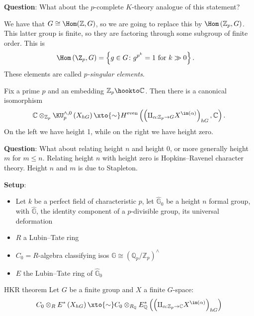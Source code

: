 \textbf{Question}: What about the $p$-complete $K$-theory analogue of this statement?

We have that $G \cong \Hom(\mathbb{Z},G)$, so we are going to replace this by $\Hom \left( \mathbb{Z}_p, G \right)$. This latter group is finite, so they are factoring through some subgroup of finite order. This is
\begin{align*}
    \Hom \left( \Z_p, G \right) &= \left\{ g\in G \colon g^{p^k} = 1 \text{ for } k \gg 0 \right\}.
\end{align*}
These elements are called $p$\textit{-singular elements}.

\begin{theorem} Fix a prime $p$ and an embedding $\mathbb{Z}_p \hookto \mathbb{C}$. Then there is a canonical isomorphism
\begin{align*}
    \mathbb{C} \otimes_{\mathbb{Z}_p} \KU_p^{\wedge,0} \left( X_{hG} \right) \xto{\sim} H^\text{even} \left( \left( \amalg_{\alpha:\mathbb{Z}_p \to G} X^{\im(\alpha)} \right)_{hG}, \mathbb{C} \right).
\end{align*}
On the left we have height 1, while on the right we have height zero.
\end{theorem}

\textbf{Question}: What about relating height $n$ and height $0$, or more generally height $m$ for $m\le n$. Relating height $n$ with height zero is Hopkins--Ravenel character theory. Height $n$ and $m$ is due to Stapleton.

\textbf{Setup}:
\begin{itemize}
    \item Let $k$ be a perfect field of characteristic $p$, let $\hat{\mathbb{G}}_0$ be a height $n$ formal group, with $\hat{\mathbb{G}}$, the identity component of a $p$-divisible group, its universal deformation
    \item $R$ a Lubin--Tate ring
    \item $C_0= R$-algebra classifying isos $\mathbb{G} \cong \left( \mathbb{Q}_p/\mathbb{Z}_p \right)^\wedge$
    \item $E$ the Lubin--Tate ring of $\hat{\mathbb{G}}_0$
\end{itemize}

\begin{customenvironment}{HKR theorem} Let $G$ be a finite group and $X$ a finite $G$-space:
\begin{align*}
     C_0 \otimes_R E^\ast \left( X_{hG} \right) \xto{\sim}  C_0 \otimes_{R_\mathbb{Q}} E_\mathbb{Q}^\ast \left( \left( \amalg_{\alpha: \mathbb{Z}_p \to \mathbb{C}} X^{\im(\alpha)} \right)_{hG} \right) 
\end{align*}

\end{customenvironment}

